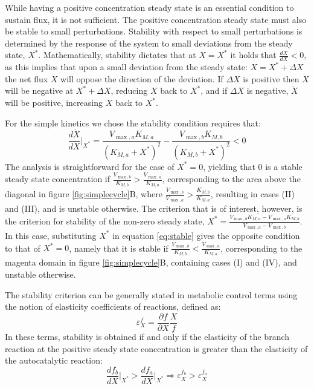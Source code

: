     While having a positive concentration steady state is an essential condition to sustain flux, it is not sufficient.
    The positive concentration steady state must also be stable to small perturbations.
    Stability with respect to small perturbations is determined by the response of the system to small deviations from the steady state, $X^*$.
    Mathematically, stability dictates that at $X=X^*$ it holds that $\frac{d\dot X}{dX} <0$, as this  implies that upon a small deviation from the steady state: $X = X^*+\Delta X$ the net flux $\dot X$ will oppose the direction of the deviation.
    If $\Delta X$ is positive then $\dot X$ will be negative at $X^*+\Delta X$, reducing $X$ back to $X^*$, and if $\Delta X$ is negative, $\dot X$ will be positive, increasing $X$ back to $X^*$.

    For the simple kinetics we chose the stability condition requires that:
    \begin{equation}
        \label{eq:stable}
      \frac{d\dot X}{dX}\Big\vert_{X^*} = \frac{V_{\max,a}K_{M,a}}{(K_{M,a}+X^*)^2}-\frac{V_{\max,b}K_{M,b}}{(K_{M,b}+X^*)^2}<0
    \end{equation}
    The analysis is straightforward for the case of $X^*=0$, yielding that $0$ is a stable steady state concentration if $\frac{V_{\max,b}}{K_{M,b}}>\frac{V_{\max,a}}{K_{M,a}}$, corresponding to the area above the diagonal in figure \ref{fig:simplecycle}B, where $\frac{V_{\max,b}}{V_{\max,a}}>\frac{K_{M,b}}{K_{M,a}}$, resulting in cases (II) and (III), and is unstable otherwise.
    The criterion that is of interest, however, is the criterion for stability of the non-zero steady state, $X^*=\frac{V_{\max,b}K_{M,a}-V_{\max,a}K_{M,b}}{V_{\max,a}-V_{\max,b}}$.
    In this case, substituting $X^*$ in equation \ref{eq:stable} gives the opposite condition to that of $X^*=0$, namely that it is stable if $\frac{V_{\max,b}}{K_{M,b}}<\frac{V_{\max,a}}{K_{M,a}}$, corresponding to the magenta domain in figure \ref{fig:simplecycle}B, containing cases (I) and (IV), and unstable otherwise.

    The stability criterion can be generally stated in metabolic control terms \cite{Fell1997-bp} using the notion of elasticity coefficients of reactions, defined as:
    \begin{equation*}
    \varepsilon^f_X=\frac{\partial f}{\partial X}\frac{X}{f}
    \end{equation*}
    In these terms, stability is obtained if and only if the elasticity of the branch reaction at the positive steady state concentration is greater than the elasticity of the autocatalytic reaction:
    \begin{equation*}
        \frac{df_b}{dX}\Big\vert_{X^*}>\frac{df_a}{dX}\Big\vert_{X^*} \Rightarrow \varepsilon^{f_b}_X>\varepsilon^{f_a}_X
    \end{equation*}
    
